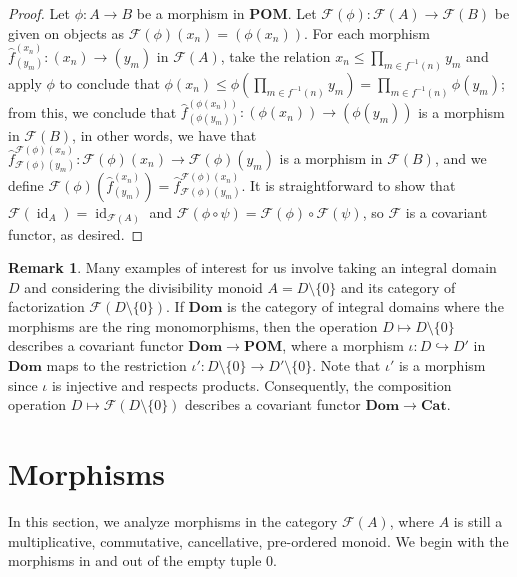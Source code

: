 \documentclass[reqno]{amsart}
\theoremstyle{plain}
\theoremstyle{definition}
\newtheorem{disc}[lem]{Remark}
\newcommand{\cat}[1]{\mathcal{#1}}
\newcommand{\catf}{\cat{F}}
\newcommand{\id}{\operatorname{id}}
\newcommand{\emptytuple}{\mathfrak{0}}
\renewcommand{\leq}{\leqslant}
\newcommand{\catcat}{\mathbf{Cat}}
\newcommand{\catdom}{\mathbf{Dom}}
\newcommand{\catpom}{\mathbf{POM}}
\numberwithin{equation}{lem}
\begin{document}
\begin{proof}
Let $\phi\colon A\to B$ be a morphism in $\catpom$. 
Let $\catf(\phi)\colon\catf(A)\to\catf(B)$ be given on objects as
$\catf(\phi)(x_n)=(\phi(x_n))$. 
For each morphism $\hat f^{(x_n)}_{(y_m)}\colon (x_n)\to (y_m)$ in $\catf(A)$,
take the  relation $x_n\leq\prod_{m\in f^{-1}(n)}y_m$ and apply $\phi$ to conclude that
$\phi(x_n)\leq\phi\left(\prod_{m\in f^{-1}(n)}y_m\right)=\prod_{m\in f^{-1}(n)}\phi(y_m)$;
from this, we conclude that $\hat f^{(\phi(x_n))}_{(\phi(y_m))}\colon(\phi(x_n))\to(\phi(y_m))$ is a morphism in $\catf(B)$, in other words,
we have that
$\hat f^{\catf(\phi)(x_n)}_{\catf(\phi)(y_m)}\colon\catf(\phi)(x_n)\to\catf(\phi)(y_m)$ is a morphism in $\catf(B)$,
and we define $\catf(\phi)(\hat f^{(x_n)}_{(y_m)})=\hat f^{\catf(\phi)(x_n)}_{\catf(\phi)(y_m)}$.
It is straightforward to show that $\catf(\id_A)=\id_{\catf(A)}$ and
$\catf(\phi\circ\psi)=\catf(\phi)\circ\catf(\psi)$, so $\catf$ is a 
covariant functor, as desired.
\end{proof}

\begin{disc}\label{disc170430d}
Many examples of interest for us involve taking an integral domain $D$ and considering the divisibility monoid $A=D\setminus\{0\}$
and its category of factorization $\catf(D\setminus\{0\})$. 
If $\catdom$ is the category of integral domains where the morphisms are the ring monomorphisms, then the operation
$D\mapsto D\setminus\{0\}$ describes a covariant functor $\catdom\to\catpom$,
where a morphism $\iota\colon D\hookrightarrow D'$ in $\catdom$ maps to the restriction $\iota'\colon D\setminus\{0\}
\to D'\setminus\{0\}$. Note that $\iota'$ is a morphism since $\iota$ is injective and respects products.
Consequently,
the composition operation $D\mapsto\catf(D\setminus\{0\})$
describes a covariant functor $\catdom\to\catcat$.
\end{disc}

\section{Morphisms}\label{sec170415b}

In this section, we analyze morphisms in the category $\catf(A)$,
where $A$ is still a multiplicative, commutative, cancellative, pre-ordered monoid.
We begin with the morphisms in and out of the empty tuple $\emptytuple$.
\end{document}
